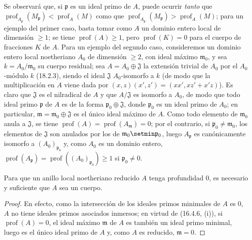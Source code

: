 \begin{env}[16.4.6.4]
\label{0.16.4.6.4-fr}
Se observará que, si $\mathfrak{p}$ es un ideal primo de $A$, puede ocurrir
\emph{tanto} que
$\operatorname{prof}_{A_{\mathfrak{p}}}(M_{\mathfrak{p}})
<\operatorname{prof}_A(M)$ como que
$\operatorname{prof}_{A_{\mathfrak{p}}}(M_{\mathfrak{p}})
>\operatorname{prof}_A(M)$; para un ejemplo del primer caso,
basta tomar como $A$ un dominio entero local de dimensión $\geq1$; se tiene
$\operatorname{prof}(A)\geq1$, pero $\operatorname{prof}(K)=0$ para el cuerpo
de fracciones $K$ de $A$. Para un ejemplo del segundo caso, consideremos un
dominio entero local noetheriano $A_0$ de dimensión $\geq2$, con ideal máximo
$\mathfrak{m}_0$, y sea $k=A_0/\mathfrak{m}_0$ su cuerpo residual; sea
$A=A_0\oplus\mathfrak{J}$ la extensión trivial de $A_0$ por el $A_0$-módulo
$k$ (18.2.3), siendo el ideal $\mathfrak{J}$ $A_0$-isomorfo a $k$ (de modo que
la multiplicación en $A$ viene dada por
$(x,z)(x',z')=(xx',xz'+x'z)$). Es claro que $\mathfrak{J}$ es el nilradical de
$A$ y que $A/\mathfrak{J}$ es isomorfo a $A_0$, de modo que todo ideal primo
$\mathfrak{p}$ de $A$ es de la forma
$\mathfrak{p}_0\oplus\mathfrak{J}$, donde $\mathfrak{p}_0$ es un ideal primo
de $A_0$; en particular, $\mathfrak{m}=\mathfrak{m}_0\oplus\mathfrak{J}$ es el
único ideal máximo de $A$. Como todo elemento de $\mathfrak{m}_0$ anula a
$\mathfrak{J}$, se tiene
$\operatorname{prof}(A)=\operatorname{prof}(A_{\mathfrak{m}})=0$; por el
contrario, si $\mathfrak{p}_0\neq\mathfrak{m}_0$, los elementos de
$\mathfrak{J}$ son anulados por los de
$\mathfrak{m}_0\setmin\mathfrak{p}_0$, luego $A_{\mathfrak{p}}$ es canónicamente
isomorfo a $(A_0)_{\mathfrak{p}_0}$ y, como $A_0$ es un dominio entero,
$\operatorname{prof}(A_{\mathfrak{p}})
=\operatorname{prof}((A_0)_{\mathfrak{p}_0})\geq1$ si
$\mathfrak{p}_0\neq0$.
\end{env}

\begin{corollary}[16.4.7]
\label{0.16.4.7-fr}
Para que un anillo local noetheriano reducido $A$ tenga profundidad $0$, es
necesario y suficiente que $A$ sea un cuerpo.
\end{corollary}

\begin{proof}
En efecto, como la intersección de los ideales primos minimales de $A$ es $0$,
$A$ no tiene ideales primos asociados inmersos; en virtud de (16.4.6, (i)), si
$\operatorname{prof}(A)=0$, el ideal máximo $\mathfrak{m}$ de $A$ es también
un ideal primo minimal, luego es el único ideal primo de $A$ y, como $A$ es
reducido, $\mathfrak{m}=0$.
\end{proof}

